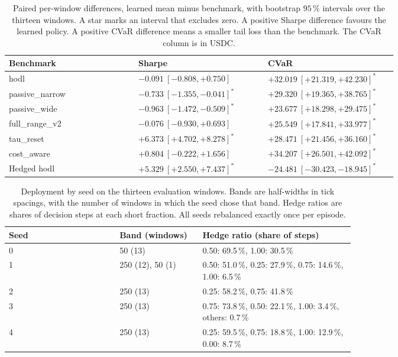 \begin{table}[tbp]
\caption{Paired per-window differences, learned mean minus benchmark, with
bootstrap $95\,\%$ intervals over the thirteen windows. A star marks an
interval that excludes zero. A positive Sharpe difference favours the learned
policy. A positive CVaR difference means a smaller tail loss than the
benchmark. The CVaR column is in USDC.}
\label{tab:paired}
\centering
\small
\begin{tabular}{@{}L{0.30\linewidth}L{0.30\linewidth}L{0.30\linewidth}@{}}
\toprule
\textbf{Benchmark} & \textbf{Sharpe} & \textbf{CVaR} \\
\midrule
\textsf{hodl} & $-0.091\ [-0.808,+0.750]$ & $+32.019\ [+21.319,+42.230]^{*}$ \\
\textsf{passive\_narrow} & $-0.733\ [-1.355,-0.041]^{*}$ & $+29.320\ [+19.365,+38.765]^{*}$ \\
\textsf{passive\_wide} & $-0.963\ [-1.472,-0.509]^{*}$ & $+23.677\ [+18.298,+29.475]^{*}$ \\
\textsf{full\_range\_v2} & $-0.076\ [-0.930,+0.693]$ & $+25.549\ [+17.841,+33.977]^{*}$ \\
\textsf{tau\_reset} & $+6.373\ [+4.702,+8.278]^{*}$ & $+28.471\ [+21.456,+36.160]^{*}$ \\
\textsf{cost\_aware} & $+0.804\ [-0.222,+1.656]$ & $+34.207\ [+26.501,+42.092]^{*}$ \\
Hedged \textsf{hodl} & $+5.329\ [+2.550,+7.437]^{*}$ & $-24.481\ [-30.423,-18.945]^{*}$ \\
\bottomrule
\end{tabular}
\end{table}

\begin{table}[tbp]
\caption{Deployment by seed on the thirteen evaluation windows. Bands are
half-widths in tick spacings, with the number of windows in which the seed
chose that band. Hedge ratios are shares of decision steps at each short
fraction. All seeds rebalanced exactly once per episode.}
\label{tab:actions}
\centering
\small
\begin{tabular}{@{}lL{0.24\linewidth}L{0.44\linewidth}@{}}
\toprule
\textbf{Seed} & \textbf{Band (windows)} & \textbf{Hedge ratio (share of steps)} \\
 & 50 (13) & 0.50: 69.5\,\%, 1.00: 30.5\,\% \\
1 & 250 (12), 50 (1) & 0.50: 51.0\,\%, 0.25: 27.9\,\%, 0.75: 14.6\,\%, 1.00: 6.5\,\% \\
2 & 250 (13) & 0.25: 58.2\,\%, 0.75: 41.8\,\% \\
3 & 250 (13) & 0.75: 73.8\,\%, 0.50: 22.1\,\%, 1.00: 3.4\,\%, others: 0.7\,\% \\
4 & 250 (13) & 0.25: 59.5\,\%, 0.75: 18.8\,\%, 1.00: 12.9\,\%, 0.00: 8.7\,\% \\
\bottomrule
\end{tabular}
\end{table}

